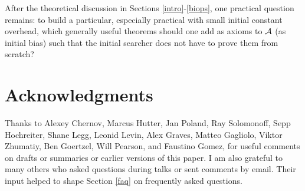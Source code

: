 After the theoretical discussion in Sections \ref{intro}-\ref{biops},
one practical question remains: to build a particular,
especially practical \gm with small initial constant overhead,
which generally useful 
theorems should one add as axioms to $\cal A$
(as initial bias) such that the initial searcher  
does not have to prove them from scratch? 

\section{Acknowledgments}
Thanks to
Alexey Chernov,
Marcus Hutter,
Jan Poland,
Ray Solomonoff,
Sepp Hochreiter,
Shane Legg,
Leonid Levin,
Alex Graves,
Matteo Gagliolo,
Viktor Zhumatiy,
Ben Goertzel,
Will Pearson,
and Faustino Gomez,
for useful comments on
drafts or summaries or
earlier versions of this paper.
I am also grateful to many others who 
asked questions during \gm talks or
sent comments by email. Their input helped to shape 
Section \ref{faq} on frequently asked questions.

\newpage





